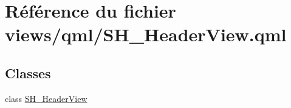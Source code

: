 \hypertarget{SH__HeaderView_8qml}{\section{Référence du fichier views/qml/\-S\-H\-\_\-\-Header\-View.qml}
\label{SH__HeaderView_8qml}
}
\subsection*{Classes}
\begin{DoxyCompactItemize}
\item 
class \hyperlink{classSH__HeaderView}{S\-H\-\_\-\-Header\-View}
\end{DoxyCompactItemize}
